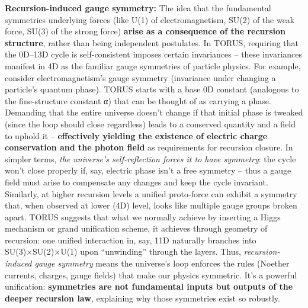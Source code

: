 \textbf{Recursion-induced gauge symmetry:} The idea that the fundamental
symmetries underlying forces (like U(1) of electromagnetism, SU(2) of
the weak force, SU(3) of the strong force) \textbf{arise as a
consequence of the recursion structure}, rather than being independent
postulates. In TORUS, requiring that the 0D--13D cycle is
self-consistent imposes certain invariances -- these invariances
manifest in 4D as the familiar gauge symmetries of particle physics​.
For example, consider electromagnetism's gauge symmetry (invariance
under changing a particle's quantum phase). TORUS starts with a base 0D
constant (analogous to the fine-structure constant α) that can be
thought of as carrying a phase. Demanding that the entire universe
doesn't change if that initial phase is tweaked (since the loop should
close regardless) leads to a conserved quantity and a field to uphold it
-- \textbf{effectively yielding the existence of electric charge
conservation and the photon field} as requirements for recursion
closure​. In simpler terms, \emph{the universe's self-reflection forces
it to have symmetry}: the cycle won't close properly if, say, electric
phase isn't a free symmetry -- thus a gauge field must arise to
compensate any changes and keep the cycle invariant. Similarly, at
higher recursion levels a unified proto-force can exhibit a symmetry
that, when observed at lower (4D) level, looks like multiple gauge
groups broken apart​. TORUS suggests that what we normally achieve by
inserting a Higgs mechanism or grand unification scheme, it achieves
through geometry of recursion: one unified interaction in, say, 11D
naturally branches into SU(3)×SU(2)×U(1) upon ``unwinding'' through the
layers​. Thus, \emph{recursion-induced gauge symmetry} means the
universe's loop enforces the rules (Noether currents, charges, gauge
fields) that make our physics symmetric. It's a powerful unification:
\textbf{symmetries are not fundamental inputs but outputs of the deeper
recursion law}, explaining why those symmetries exist so robustly.

